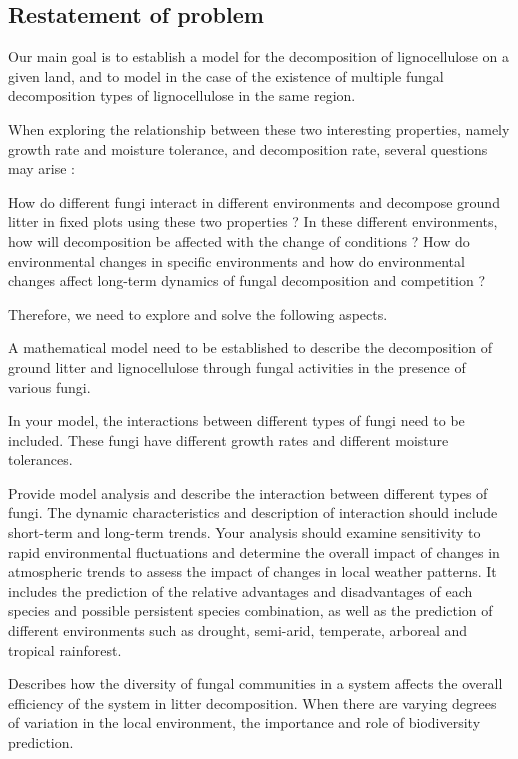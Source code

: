 \documentclass{mcmthesis}
\begin{document}
\subsection{Restatement of problem}

Our main goal is to establish a model for the decomposition of lignocellulose on a given land, and to model in the case of the existence of multiple fungal decomposition types of lignocellulose in the same region. 

When exploring the relationship between these two interesting properties, namely growth rate and moisture tolerance, and decomposition rate, several questions may arise : 

How do different fungi interact in different environments and decompose ground litter in fixed plots using these two properties ? In these different environments, how will decomposition be affected with the change of conditions ? How do environmental changes in specific environments and how do environmental changes affect long-term dynamics of fungal decomposition and competition ? 

Therefore, we need to explore and solve the following aspects. 

A mathematical model need to be established to describe the decomposition of ground litter and lignocellulose through fungal activities in the presence of various fungi. 

In your model, the interactions between different types of fungi need to be included. These fungi have different growth rates and different moisture tolerances. 

Provide model analysis and describe the interaction between different types of fungi. The dynamic characteristics and description of interaction should include short-term and long-term trends. Your analysis should examine sensitivity to rapid environmental fluctuations and determine the overall impact of changes in atmospheric trends to assess the impact of changes in local weather patterns.
It includes the prediction of the relative advantages and disadvantages of each species and possible persistent species combination, as well as the prediction of different environments such as drought, semi-arid, temperate, arboreal and tropical rainforest.

Describes how the diversity of fungal communities in a system affects the overall efficiency of the system in litter decomposition. When there are varying degrees of variation in the local environment, the importance and role of biodiversity prediction. 
\end{document}
